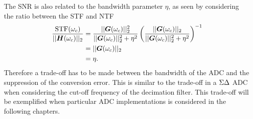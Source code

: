 The SNR is also related to the bandwidth parameter $\eta$, as seen by considering the ratio between the STF and NTF
\begin{align}
    \frac{\text{STF}(\omega_c)}{||\bm{H}(\omega_c)||_2} &= \frac{||\bm{G}(\omega_c)||_{2}^2}{||\bm{G}(\omega_c)||_{2}^2 + \eta^2 } \left( \frac{||\bm{G}(\omega_c)||_{2}}{||\bm{G}(\omega_c)||_{2}^2 + \eta^2 } \right)^{-1} \label{eq:stf_eta_start}\\
    & = ||\bm{G}(\omega_c)||_{2} \\ &= \eta \label{eq:stf_eta_end}.
\end{align}
Therefore a trade-off has to be made between the bandwidth of the ADC and the suppression of the conversion error. This is similar to the trade-off in a $\Sigma\Delta$ ADC when considering the cut-off frequency of the decimation filter. This trade-off will be exemplified when particular ADC implementations is considered in the following chapters.

